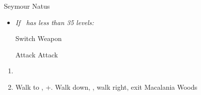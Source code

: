 \bothvfill
\begin{battle}[36000]{Seymour Natus}
	\begin{itemize}
		\item \textit{If \lulu\ has less than 35 levels:}
		      \begin{itemize}
			      \switch{\tidus}{\lulu}
			      \luluf Switch Weapon
			      \switch{\lulu}{\tidus}
		      \end{itemize}
		      \tidusf Attack
		      \summon{\bahamut}
		      \bahamutf Attack
	\end{itemize}
\end{battle}
\begin{enumerate}[resume]
	\item \sd
	\item Walk to \yuna, \cs+\skippablefmv[10:10]. Walk down, \cs[1:40], walk right, exit Macalania Woods
\end{enumerate}
